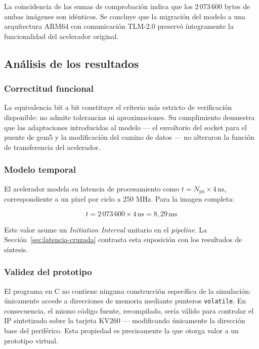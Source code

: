 \documentclass[11pt,letterpaper]{article}
\begin{document}
La coincidencia de las sumas de comprobación indica que los 2\,073\,600 bytes de
ambas imágenes son idénticos. Se concluye que la migración del modelo a una
arquitectura ARM64 con comunicación TLM-2.0 preservó íntegramente la
funcionalidad del acelerador original.

\subsection{Análisis de los resultados}

\subsubsection{Correctitud funcional}

La equivalencia bit a bit constituye el criterio más estricto de verificación
disponible: no admite tolerancias ni aproximaciones. Su cumplimiento demuestra
que las adaptaciones introducidas al modelo --- el envoltorio del socket para el
puente de gem5 y la modificación del camino de datos --- no alteraron la
función de transferencia del acelerador.

\subsubsection{Modelo temporal}

El acelerador modela su latencia de procesamiento como
$t = N_{\text{px}} \times 4\,\text{ns}$, correspondiente a un píxel por ciclo a
250 MHz. Para la imagen completa:

\begin{equation}
t = 2\,073\,600 \times 4\,\text{ns} = 8{,}29\,\text{ms}
\end{equation}

Este valor asume un \emph{Initiation Interval} unitario en el
\emph{pipeline}. La Sección~\ref{sec:latencia-cruzada} contrasta esta
suposición con los resultados de síntesis.

\subsubsection{Validez del prototipo}

El programa en C no contiene ninguna construcción específica de la simulación:
únicamente accede a direcciones de memoria mediante punteros \texttt{volatile}.
En consecuencia, el mismo código fuente, recompilado, sería válido para
controlar el IP sintetizado sobre la tarjeta KV260 --- modificando únicamente la
dirección base del periférico. Esta propiedad es precisamente la que otorga
valor a un prototipo virtual.
\end{document}
